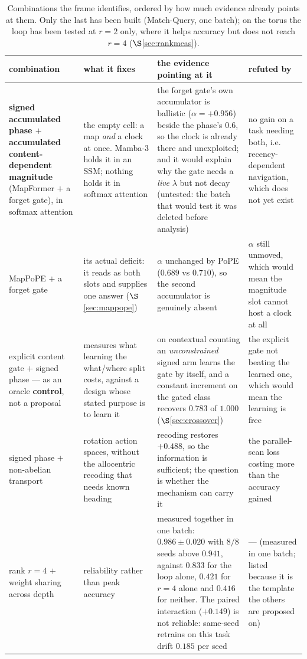 \documentclass[11pt]{article}
\begin{document}
\begin{table}[htbp]\centering\small
\caption{Combinations the frame identifies, ordered by how much evidence already points at them. Only the last has been built (Match-Query, one batch); on the torus the loop has been tested at $r=2$ only, where it helps accuracy but does not reach $r=4$ ($\S$\ref{sec:rankmeas}).}
\label{tab:combinations}
\begin{tabular}{@{}p{3.6cm}p{3.9cm}p{3.6cm}p{3.2cm}@{}}
\toprule
combination & what it fixes & the evidence pointing at it & refuted by \\
\midrule
\textbf{signed accumulated phase $+$ accumulated content-dependent magnitude} (MapFormer $+$ a forget gate), in softmax attention & the empty cell: a map \emph{and} a clock at once. Mamba-3 holds it in an SSM; nothing holds it in softmax attention & the forget gate's own accumulator is ballistic ($\alpha = +0.956$) beside the phase's $0.6$, so the clock is already there and unexploited; and it would explain why the gate needs a \emph{live} $\lambda$ but not decay (untested: the batch that would test it was deleted before analysis) & no gain on a task needing both, i.e. recency-dependent navigation, which does not yet exist \\[3pt]
MapPoPE $+$ a forget gate & its actual deficit: it reads as both slots and supplies one answer ($\S$\ref{sec:mappope}) & $\alpha$ unchanged by PoPE ($0.689$ vs $0.710$), so the second accumulator is genuinely absent & $\alpha$ still unmoved, which would mean the magnitude slot cannot host a clock at all \\[3pt]
explicit content gate $+$ signed phase --- as an oracle \textbf{control}, not a proposal & measures what learning the what/where split costs, against a design whose stated purpose is to learn it & on contextual counting an \emph{unconstrained} signed arm learns the gate by itself, and a constant increment on the gated class recovers $0.783$ of $1.000$ ($\S$\ref{sec:crossover}) & the explicit gate not beating the learned one, which would mean the learning is free \\[3pt]
signed phase $+$ non-abelian transport & rotation action spaces, without the allocentric recoding that needs known heading & recoding restores $+0.488$, so the information is sufficient; the question is whether the mechanism can carry it & the parallel-scan loss costing more than the accuracy gained \\[3pt]
rank $r{=}4$ $+$ weight sharing across depth & reliability rather than peak accuracy & measured together in one batch: $0.986 \pm 0.020$ with $8/8$ seeds above $0.941$, against $0.833$ for the loop alone, $0.421$ for $r{=}4$ alone and $0.416$ for neither. The paired interaction ($+0.149$) is not reliable: same-seed retrains on this task drift $0.185$ per seed & --- (measured in one batch; listed because it is the template the others are proposed on) \\
\bottomrule
\end{tabular}
\end{table}
\end{document}
